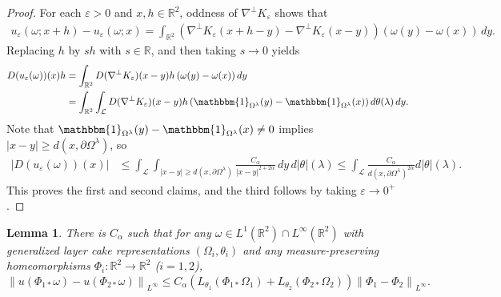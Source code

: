 \documentclass[reqno,centertags,12pt]{amsart}
\newtheorem{lemma}[theorem]{Lemma}
\theoremstyle{definition}
\numberwithin{equation}{section}
\newcommand{\abs}[1]{\left\lvert#1\right\rvert}
\newcommand{\norm}[1]{\left\|#1\right\|}
\newcommand{\bbR}{{\mathbb{R}}}
\newcommand{\eps}{\varepsilon}
\begin{document}
\begin{proof}
    For each $\eps>0$ and $x,h\in\bbR^{2}$, oddness of $\nabla^{\perp}K_{\eps}$ shows that
    \begin{align*}
        u_{\eps}(\omega;x+h) - u_{\eps}(\omega;x)
        = \int_{\bbR^{2}}\left(
            \nabla^{\perp}K_{\eps}(x + h - y) - \nabla^{\perp}K_{\eps}(x - y)
        \right)
        (\omega(y) - \omega(x))\,dy.
    \end{align*}
    Replacing $h$ by $sh$ with $s\in\bbR$, and then taking $s\to 0$ yields
    \begin{align*}
        D(u_{\eps}(\omega))(x)h
        &= \int_{\bbR^{2}}
        D(\nabla^{\perp}K_{\eps})(x-y)h \,
        (\omega(y) - \omega(x))\,dy \\
        &= \int_{\bbR^{2}}\int_{\mathcal{L}}
        D(\nabla^{\perp}K_{\eps})(x-y)h
        \left(
            \mathbbm{1}_{\Omega^{\lambda}}(y)
            - \mathbbm{1}_{\Omega^{\lambda}}(x)
        \right)
        d\theta(\lambda)\,dy.
    \end{align*}
    Note that $\mathbbm{1}_{\Omega^{\lambda}}(y)
    - \mathbbm{1}_{\Omega^{\lambda}}(x) \neq 0$ implies
    $\abs{x - y} \geq d(x,\partial\Omega^{\lambda})$, so
    \begin{align*}
        \abs{D(u_{\eps}(\omega))(x)}
        &\leq \int_{\mathcal{L}}\int_{\abs{x-y} \geq d(x,\partial\Omega^{\lambda})}
        \frac{C_{\alpha}}{\abs{x - y}^{2+2\alpha}}\,dy\,d|\theta|(\lambda)
        \leq \int_{\mathcal{L}}\frac{C_{\alpha}}
        {d(x,\partial\Omega^{\lambda})^{2\alpha}}d|\theta|(\lambda).
    \end{align*}
   This proves the first and second claims, and the third follows by taking 
   $\eps\to 0^{+}$.
\end{proof}

\begin{lemma}\label{L2.2}
    There is $C_{\alpha}$ such that for any
    $\omega\in L^{1}(\bbR^{2})\cap L^{\infty}(\bbR^{2})$ with
    generalized layer cake representations
    $(\Omega_{i},\theta_{i})$ and any measure-preserving homeomorphisms
    $\Phi_{i}\colon\bbR^{2}\to\bbR^{2}$ ($i=1,2$),
    \[
        \norm{u(\Phi_{1*}\omega) - u(\Phi_{2*}\omega)}_{L^{\infty}} \leq
        C_{\alpha} \left(
            L_{\theta_{1}}(\Phi_{1*}\Omega_{1}) + L_{\theta_{2}}(\Phi_{2*}\Omega_{2})
        \right)
        \norm{\Phi_{1} - \Phi_{2}}_{L^{\infty}}.
    \]
\end{lemma}
\end{document}
